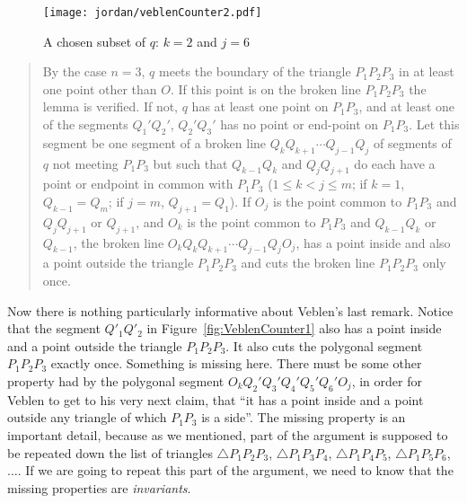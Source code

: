 \begin{figure}
\centering
\texttt{[image: jordan/veblenCounter2.pdf]}
\caption{A chosen subset of $q$: $k=2$ and $j=6$}
\label{fig:VeblenCounter2}
\end{figure}

\begin{quotation}
By the case $n=3$, $q$ meets the boundary of the triangle $P_1P_2P_3$ in at least one point other than $O$. If this point is on the broken line $P_1P_2P_3$ the lemma is verified. If not, $q$ has at least one point on $P_1P_3$, and at least one of the segments $Q_1'Q_2'$, $Q_2'Q_3'$ has no point or end-point on $P_1P_3$. Let this segment be one segment of a broken line $Q_kQ_{k+1}\cdots Q_{j-1}Q_j$ of segments of $q$ not meeting $P_1P_3$ but such that $Q_{k-1}Q_k$ and $Q_jQ_{j+1}$ do each have a point or endpoint in common with $P_1P_3$ ($1 \leq k < j \leq m$; if $k = 1$, $Q_{k-1} = Q_m$; if $j = m$, $Q_{j+1} = Q_1$). If $O_j$ is the point common to $P_1P_3$ and $Q_jQ_{j+1}$ or $Q_{j+1}$, and $O_k$ is the point common to $P_1P_3$ and $Q_{k-1}Q_k$ or $Q_{k-1}$, the broken line $O_kQ_kQ_{k+1}\cdots Q_{j-1}Q_jO_j$, has a point inside and also a point outside the triangle $P_1P_2P_3$ and cuts the broken line $P_1P_2P_3$ only once.
\end{quotation}

Now there is nothing particularly informative about Veblen's last remark. Notice that the segment $Q'_1Q'_2$ in Figure~\ref{fig:VeblenCounter1} also has a point inside and a point outside the triangle $P_1P_2P_3$. It also cuts the polygonal segment $P_1P_2P_3$ exactly once. Something is missing here. There must be some other property had by the polygonal segment $O_kQ_2'Q_3'Q_4'Q_5'Q_6'O_j$, in order for Veblen to get to his very next claim, that ``it has a point inside and a point outside any triangle of which $P_1P_3$ is a side''. The missing property is an important detail, because as we mentioned, part of the argument is supposed to be repeated down the list of triangles $\triangle P_1P_2P_3$, $\triangle P_1P_3P_4$, $\triangle P_1P_4P_5$, $\triangle P_1P_5P_6$, $\ldots$. If we are going to repeat this part of the argument, we need to know that the missing properties are \emph{invariants}.

